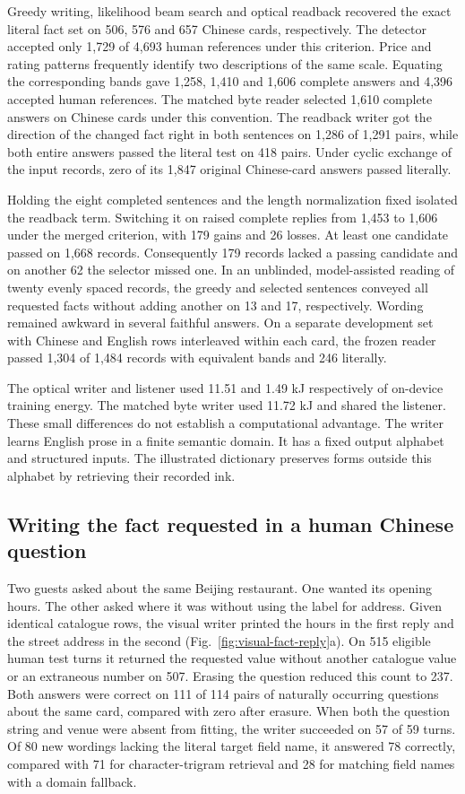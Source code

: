 \documentclass[12pt,a4paper]{article}
\providecommand{\DIFadd}[1]{{\protect\color{blue} \sf #1}} %
\begin{document}
\DIFadd{Greedy writing, likelihood beam search and optical readback recovered the exact literal fact set on 506, 576 and 657 Chinese cards, respectively. The detector accepted only 1,729 of 4,693 human references under this criterion. Price and rating patterns frequently identify two descriptions of the same scale. Equating the corresponding bands gave 1,258, 1,410 and 1,606 complete answers and 4,396 accepted human references. The matched byte reader selected 1,610 complete answers on Chinese cards under this convention. The readback writer got the direction of the changed fact right in both sentences on 1,286 of 1,291 pairs, while both entire answers passed the literal test on 418 pairs. Under cyclic exchange of the input records, zero of its 1,847 original Chinese-card answers passed literally.
}

\DIFadd{Holding the eight completed sentences and the length normalization fixed isolated the readback term. Switching it on raised complete replies from 1,453 to 1,606 under the merged criterion, with 179 gains and 26 losses. At least one candidate passed on 1,668 records. Consequently 179 records lacked a passing candidate and on another 62 the selector missed one. In an unblinded, model-assisted reading of twenty evenly spaced records, the greedy and selected sentences conveyed all requested facts without adding another on 13 and 17, respectively. Wording remained awkward in several faithful answers. On a separate development set with Chinese and English rows interleaved within each card, the frozen reader passed 1,304 of 1,484 records with equivalent bands and 246 literally.
}

\DIFadd{The optical writer and listener used 11.51 and 1.49 kJ respectively of on-device training energy. The matched byte writer used 11.72 kJ and shared the listener. These small differences do not establish a computational advantage. The writer learns English prose in a finite semantic domain. It has a fixed output alphabet and structured inputs. The illustrated dictionary preserves forms outside this alphabet by retrieving their recorded ink.
}

\subsection*{\DIFadd{Writing the fact requested in a human Chinese question}}
\DIFadd{Two guests asked about the same Beijing restaurant. One wanted its opening hours. The other asked where it was without using the label for address. Given identical catalogue rows, the visual writer printed the hours in the first reply and the street address in the second (Fig.~\ref{fig:visual-fact-reply}a). On 515 eligible human test turns it returned the requested value without another catalogue value or an extraneous number on 507. Erasing the question reduced this count to 237. Both answers were correct on 111 of 114 pairs of naturally occurring questions about the same card, compared with zero after erasure. When both the question string and venue were absent from fitting, the writer succeeded on 57 of 59 turns. Of 80 new wordings lacking the literal target field name, it answered 78 correctly, compared with 71 for character-trigram retrieval and 28 for matching field names with a domain fallback.
}
\end{document}
